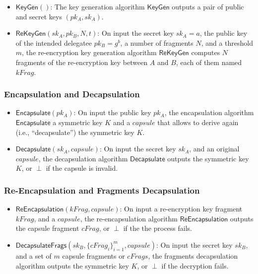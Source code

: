 \documentclass{amsart}
\providecommand{\pk}[1]{pk_{#1}}
\providecommand{\sk}[1]{sk_{#1}}
\begin{document}
\begin{itemize}

	\item $\mathsf{KeyGen}()$: The key generation algorithm $\mathsf{KeyGen}$ outputs a pair of public and secret keys $(\pk{A}, \sk{A})$.
	\item $\mathsf{ReKeyGen}(sk_A, pk_B, N, t)$: On input the secret key $sk_{A} = a$, the public key of the intended delegatee $pk_{B} = g^b$, a number of fragments $N$, and a threshold $m$, the re-encryption key generation algorithm $\mathsf{ReKeyGen}$ computes $N$ fragments of the re-encryption key between $A$ and $B$, each of them named $kFrag$. 
\end{itemize}


\subsubsection{Encapsulation and Decapsulation}

\begin{itemize}
	\item $\mathsf{Encapsulate}(pk_A)$: On input the public key $pk_A$, the encapsulation algorithm $\mathsf{Encapsulate}$ a symmetric key $K$ and a $capsule$ that allows to derive again (i.e., ``decapsulate'') the symmetric key $K$. 
	
	\item $\mathsf{Decapsulate}(sk_A, capsule)$: On input the secret key $sk_A$, and an original $capsule$, the decapsulation algorithm $\mathsf{Decapsulate}$ outputs the symmetric key $K$, or $\perp$ if the capsule is invalid. 

	
\end{itemize}

\subsubsection{Re-Encapsulation and Fragments Decapsulation}%

\begin{itemize}
\item $\mathsf{ReEncapsulation}(kFrag, capsule)$: On input a re-encryption key fragment $kFrag$, and a $capsule$, the re-encapsulation algorithm $\mathsf{ReEncapsulation}$ outputs the capsule fragment $cFrag$, or $\perp$ if the the process fails.

	\item $\mathsf{DecapsulateFrags}(sk_B, \{cFrag_i\}_{i=1}^m, capsule)$: On input the secret key $sk_B$, and a set of $m$ capsule fragments or $cFrags$, the fragments decapsulation algorithm outputs the symmetric key $K$, or $\perp$ if the decryption fails. 

\end{itemize}
\end{document}
